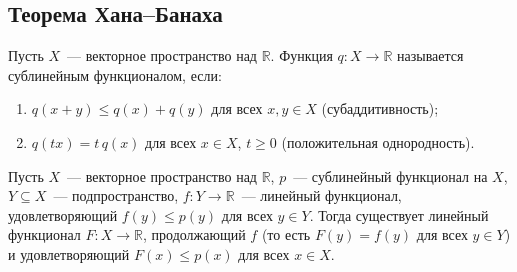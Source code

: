 \documentclass[12pt]{article}
\begin{document}
    \subsection{Теорема Хана--Банаха}
    
    \begin{definition}
    	Пусть $X$~--- векторное пространство над $\mathbb{R}$. Функция $q: X \rightarrow \mathbb{R}$ называется сублинейным функционалом, если:
    	\begin{enumerate}
    		\item $q(x + y) \leqslant q(x) + q(y)$ для всех $x, y \in X$ (субаддитивность);
    		\item $q(tx) = t\, q(x)$ для всех $x \in X$, $t \geqslant 0$ (положительная однородность).
    	\end{enumerate}
    \end{definition}
    
    \begin{theorem}
    	Пусть $X$~--- векторное пространство над $\mathbb{R}$, $p$~--- сублинейный функционал на $X$, $Y \subseteq X$~--- подпространство, $f: Y \rightarrow \mathbb{R}$~--- линейный функционал, удовлетворяющий $f(y) \leqslant p(y)$ для всех $y \in Y$. Тогда существует линейный функционал $F: X \rightarrow \mathbb{R}$, продолжающий $f$ (то есть $F(y) = f(y)$ для всех $y \in Y$) и удовлетворяющий $F(x) \leqslant p(x)$ для всех $x \in X$.
    \end{theorem}
    
\end{document}
